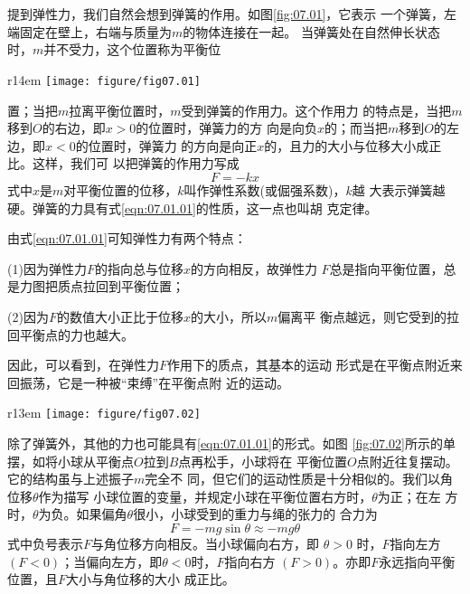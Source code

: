 \documentclass[../outline-of-mechanics.tex]{subfiles}
\begin{document}
\section[弹性力]{}\label{sec:07.01}

提到弹性力，我们自然会想到弹簧的作用。如图\ref{fig:07.01}，它表示
一个弹簧，左端固定在壁上，右端与质量为$ m $的物体连接在一起。
当弹簧处在自然伸长状态时，$ m $并不受力，这个位置称为平衡位
\begin{wrapfigure}[6]{r}{14em}
  \centering
  \texttt{[image: figure/fig07.01]}\\[1em]
  \caption{弹簧的力}
  \label{fig:07.01}
\end{wrapfigure}
置；当把$ m $拉离平衡位置时，$ m $受到弹簧的作用力。这个作用力
的特点是，当把$ m $移到$ O $的右边，即$ x > 0 $的位置时，弹簧力的方
向是向负$ x $的；而当把$ m $移到$ O $的左边，即$ x<0 $的位置时，弹簧力
的方向是向正$ x $的，且力的大小与位移大小成正比。这样，我们可
以把弹簧的作用力写成
\begin{equation}\label{eqn:07.01.01}
  F = - k x
\end{equation}
式中$ x $是$ m $对平衡位置的位移，$ k $叫作弹性系数(或倔强系数)，$ k $越
大表示弹簧越硬。弹簧的力具有式\eqref{eqn:07.01.01}的性质，这一点也叫胡
克定律。

由式\eqref{eqn:07.01.01}可知弹性力有两个特点：

(1)因为弹性力$ F $的指向总与位移$ x $的方向相反，故弹性力
$ F $总是指向平衡位置，总是力图把质点拉回到平衡位置；

(2)因为$ F $的数值大小正比于位移$ x $的大小，所以$ m $偏离平
衡点越远，则它受到的拉回平衡点的力也越大。

因此，可以看到，在弹性力$ F $作用下的质点，其基本的运动
形式是在平衡点附近来回振荡，它是一种被“束缚”在平衡点附
近的运动。

\begin{wrapfigure}[10]{r}{13em}
  \centering
  \texttt{[image: figure/fig07.02]}
  \caption{单摆}
  \label{fig:07.02}
\end{wrapfigure}
除了弹簧外，其他的力也可能具有\eqref{eqn:07.01.01}的形式。如图
\ref{fig:07.02}\;所示的单摆，如将小球从平衡点$ O $拉到$ B $点再松手，小球将在
平衡位置$ O $点附近往复摆动。它的结构虽与上述振子$ m $完全不
同，但它们的运动性质是十分相似的。我们以角位移$ \theta $作为描写
小球位置的变量，并规定小球在平衡位置右方时，$ \theta $为正；在左
方时，$ \theta $为负。如果偏角$ \theta $很小，小球受到的重力与绳的张力的
合力为
\begin{equation}\label{eqn:07.01.02}
  F = - m g \sin \theta \approx - m g \theta
\end{equation}
式中负号表示$ F $与角位移方向相反。当小球偏向右方，即 $ \theta > 0 $
时，$ F $指向左方$ \left( F < 0 \right) $；当偏向左方，即$ \theta < 0 $时，$ F $指向右方
$ \left( F > 0 \right) $。亦即$ F $永远指向平衡位置，且$ F $大小与角位移的大小
成正比。
\end{document}
